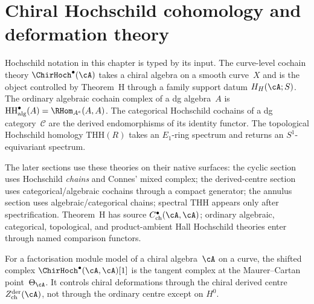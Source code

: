 \chapter{Chiral Hochschild cohomology and deformation theory}
\label{chap:hochschild-calculus}\label{ch:hochschild-cohomology}


\begin{remark}
\label{rem:hh-three-theories-discipline}

Hochschild notation in this chapter is typed by its input. The
curve-level cochain theory
$\ChirHoch^\bullet(\cA)$ takes a chiral algebra on a smooth curve~$X$
and is the object controlled by Theorem~H through a family support
datum $H_H(\cA;S)$.  The ordinary algebraic cochain
complex of a dg algebra~$A$ is
$\mathrm{HH}^\bullet_{\mathrm{alg}}(A)=\RHom_{A^e}(A,A)$. The
categorical Hochschild cochains of a dg category~$\mathcal C$ are
the derived endomorphisms of its identity functor. The topological
Hochschild homology $\mathrm{THH}(R)$ takes an $E_1$-ring spectrum
and returns an $S^1$-equivariant spectrum.

The later sections use these theories on their native surfaces:
the cyclic section uses Hochschild \emph{chains} and Connes' mixed
complex; the derived-centre section uses categorical/algebraic
cochains through a compact generator; the annulus section uses
algebraic/categorical chains; spectral $\mathrm{THH}$ appears only
after spectrification.  Theorem~H has source
$C^\bullet_{\mathrm{ch}}(\cA,\cA)$; ordinary algebraic, categorical,
topological, and product-ambient Hall Hochschild theories enter through
named comparison functors.
\end{remark}

For a factorisation module model of a chiral algebra~$\cA$ on a
curve, the shifted complex $\ChirHoch^\bullet(\cA,\cA)[1]$ is the
tangent complex at the Maurer--Cartan point~$\Theta_\cA$. It controls
chiral deformations through the chiral derived centre
$Z^{\mathrm{der}}_{\mathrm{ch}}(\cA)$, not through the ordinary
centre except on $H^0$.

